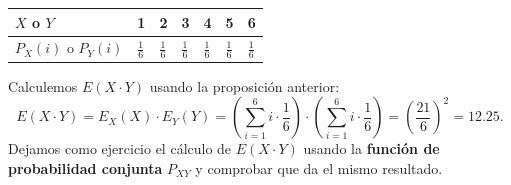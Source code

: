 \documentclass[]{book}
\begin{document}
\begin{longtable}[]{@{}lllllll@{}}
\toprule
\begin{minipage}[b]{0.15\columnwidth}\raggedright
\(X\) o \(Y\)\strut
\end{minipage} & \begin{minipage}[b]{0.11\columnwidth}\raggedright
1\strut
\end{minipage} & \begin{minipage}[b]{0.11\columnwidth}\raggedright
2\strut
\end{minipage} & \begin{minipage}[b]{0.11\columnwidth}\raggedright
3\strut
\end{minipage} & \begin{minipage}[b]{0.11\columnwidth}\raggedright
4\strut
\end{minipage} & \begin{minipage}[b]{0.11\columnwidth}\raggedright
5\strut
\end{minipage} & \begin{minipage}[b]{0.11\columnwidth}\raggedright
6\strut
\end{minipage}\tabularnewline
\midrule
\endhead
\begin{minipage}[t]{0.15\columnwidth}\raggedright
\(P_X(i)\) o \(P_Y(i)\)\strut
\end{minipage} & \begin{minipage}[t]{0.11\columnwidth}\raggedright
\(\frac{1}{6}\)\strut
\end{minipage} & \begin{minipage}[t]{0.11\columnwidth}\raggedright
\(\frac{1}{6}\)\strut
\end{minipage} & \begin{minipage}[t]{0.11\columnwidth}\raggedright
\(\frac{1}{6}\)\strut
\end{minipage} & \begin{minipage}[t]{0.11\columnwidth}\raggedright
\(\frac{1}{6}\)\strut
\end{minipage} & \begin{minipage}[t]{0.11\columnwidth}\raggedright
\(\frac{1}{6}\)\strut
\end{minipage} & \begin{minipage}[t]{0.11\columnwidth}\raggedright
\(\frac{1}{6}\)\strut
\end{minipage}\tabularnewline
\bottomrule
\end{longtable}

Calculemos \(E(X\cdot Y)\) usando la proposición anterior:
\[
E(X\cdot Y)=E_X(X)\cdot E_Y(Y)=\left(\sum_{i=1}^6 i\cdot \frac{1}{6}\right)\cdot \left(\sum_{i=1}^6 i\cdot \frac{1}{6}\right)=\left(\frac{21}{6}\right)^2 = 12.25.
\]
Dejamos como ejercicio el cálculo de \(E(X\cdot Y)\) usando la \textbf{función de probabilidad conjunta} \(P_{XY}\) y comprobar que da el mismo resultado.
\end{document}
